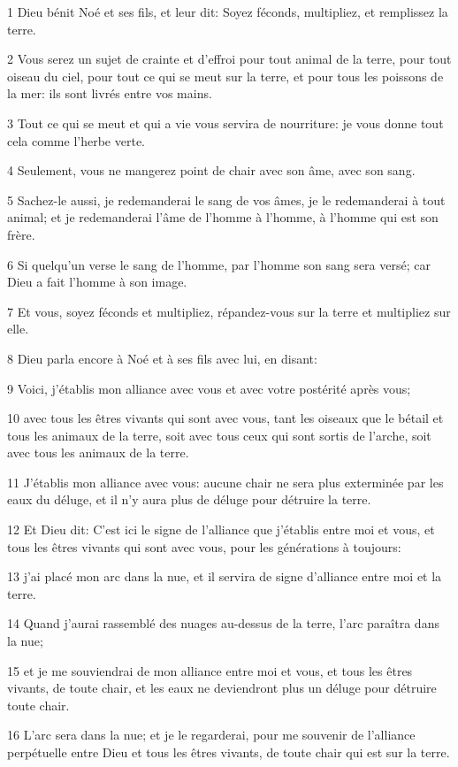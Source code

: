 \par 1 Dieu bénit Noé et ses fils, et leur dit: Soyez féconds, multipliez, et remplissez la terre.
\par 2 Vous serez un sujet de crainte et d'effroi pour tout animal de la terre, pour tout oiseau du ciel, pour tout ce qui se meut sur la terre, et pour tous les poissons de la mer: ils sont livrés entre vos mains.
\par 3 Tout ce qui se meut et qui a vie vous servira de nourriture: je vous donne tout cela comme l'herbe verte.
\par 4 Seulement, vous ne mangerez point de chair avec son âme, avec son sang.
\par 5 Sachez-le aussi, je redemanderai le sang de vos âmes, je le redemanderai à tout animal; et je redemanderai l'âme de l'homme à l'homme, à l'homme qui est son frère.
\par 6 Si quelqu'un verse le sang de l'homme, par l'homme son sang sera versé; car Dieu a fait l'homme à son image.
\par 7 Et vous, soyez féconds et multipliez, répandez-vous sur la terre et multipliez sur elle.
\par 8 Dieu parla encore à Noé et à ses fils avec lui, en disant:
\par 9 Voici, j'établis mon alliance avec vous et avec votre postérité après vous;
\par 10 avec tous les êtres vivants qui sont avec vous, tant les oiseaux que le bétail et tous les animaux de la terre, soit avec tous ceux qui sont sortis de l'arche, soit avec tous les animaux de la terre.
\par 11 J'établis mon alliance avec vous: aucune chair ne sera plus exterminée par les eaux du déluge, et il n'y aura plus de déluge pour détruire la terre.
\par 12 Et Dieu dit: C'est ici le signe de l'alliance que j'établis entre moi et vous, et tous les êtres vivants qui sont avec vous, pour les générations à toujours:
\par 13 j'ai placé mon arc dans la nue, et il servira de signe d'alliance entre moi et la terre.
\par 14 Quand j'aurai rassemblé des nuages au-dessus de la terre, l'arc paraîtra dans la nue;
\par 15 et je me souviendrai de mon alliance entre moi et vous, et tous les êtres vivants, de toute chair, et les eaux ne deviendront plus un déluge pour détruire toute chair.
\par 16 L'arc sera dans la nue; et je le regarderai, pour me souvenir de l'alliance perpétuelle entre Dieu et tous les êtres vivants, de toute chair qui est sur la terre.
